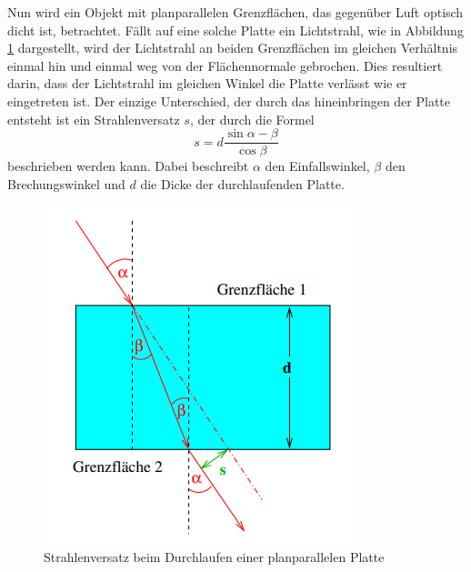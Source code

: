 \noindent Nun wird ein Objekt mit planparallelen Grenzflächen, das gegenüber Luft optisch dicht ist, betrachtet.
Fällt auf eine solche Platte ein Lichtstrahl, wie in Abbildung \ref{fig:StrV} dargestellt, wird
der Lichtstrahl an beiden Grenzflächen im gleichen Verhältnis einmal hin und einmal weg von der 
Flächennormale gebrochen. Dies resultiert darin, dass der Lichtstrahl im gleichen Winkel die Platte 
verlässt wie er eingetreten ist. Der einzige Unterschied, der durch das hineinbringen der Platte entsteht
ist ein Strahlenversatz $s$, der durch die Formel
\begin{equation}
    s=d\frac{\sin{\alpha-\beta}}{\cos{\beta}}
    \label{eq:Strahlenversatz}
\end{equation}
beschrieben werden kann. Dabei beschreibt $\alpha$ den Einfallswinkel, $\beta$ den Brechungswinkel und $d$
die Dicke der durchlaufenden Platte.
\begin{figure}
    \centering
    \includegraphics{content/Strahlenversatz.png}
    \caption{Strahlenversatz beim Durchlaufen einer planparallelen Platte\cite{V400}}
    \label{fig:StrV}
\end{figure}
